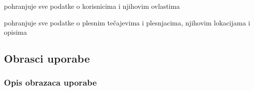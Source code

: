 \begin{packed_enum}
\begin{packed_enum}
					
				\end{packed_enum}
			
			
				\item  {}
				
				\begin{packed_enum}
					
					\item pohranjuje sve podatke o korisnicima i njihovim ovlastima
					\item pohranjuje sve podatke o plesnim tečajevima i plesnjacima, njihovim lokacijama i opisima

					
				\end{packed_enum}
			\end{packed_enum}
			
			\eject 
			
			
				
			\subsection{Obrasci uporabe}
				
				\subsubsection{Opis obrazaca uporabe}

